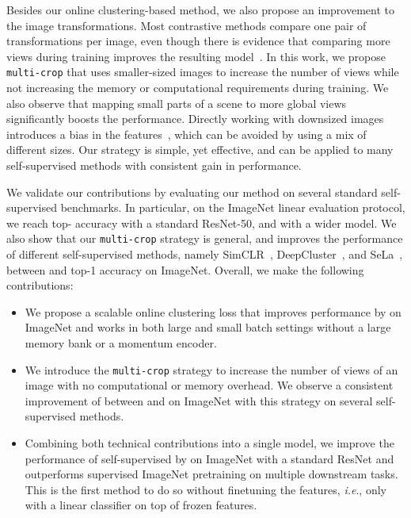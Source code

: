 \documentclass{article}
\def\onedot{.}
\def\ie{\emph{i.e}\onedot} \def\Ie{\emph{I.e}\onedot}
\newcommand{\ImNet}{ImageNet\xspace}
\begin{document}
Besides our online clustering-based method, we also propose an improvement to the image transformations.
Most contrastive methods compare one pair of transformations per image, even though there is evidence that comparing more views during training improves the resulting model~\cite{misra2019self}. 
In this work, we propose \texttt{multi-crop} that uses smaller-sized images to increase the number of views while not increasing the memory or computational requirements during training. 
We also observe that mapping small parts of a scene to more global views significantly boosts the performance.
Directly working with downsized images introduces a bias in the features~\cite{touvron2019fixing}, which can be avoided by using a mix of different sizes. 
Our strategy is simple, yet effective, and can be applied to many self-supervised methods with consistent gain in performance.

We validate our contributions by evaluating our method on several standard self-supervised benchmarks.
In particular, on the ImageNet linear evaluation protocol, we reach  top- accuracy with a standard ResNet-50, and  with a wider model.
We also show that our \texttt{multi-crop} strategy is general, and improves the performance of different self-supervised methods, namely SimCLR~\cite{chen2020simple}, DeepCluster~\cite{caron2018deep}, and SeLa~\cite{asano2019self}, between  and  top-1 accuracy on ImageNet.
Overall, we make the following contributions:
\begin{itemize}[leftmargin=*]
\itemsep0.05em 

\item
We propose a scalable online clustering loss that improves performance by  on ImageNet and works in both large and small batch settings without a large memory bank or a momentum encoder.
\item
We introduce the \texttt{multi-crop} strategy to increase the number of views of an image with no computational or memory overhead.
We observe a consistent improvement of between  and  on \ImNet with this strategy on several self-supervised methods.
\item
Combining both technical contributions into a single model, we improve the performance of self-supervised by  on ImageNet with a standard ResNet and outperforms supervised ImageNet pretraining on multiple downstream tasks.
This is the first method to do so without finetuning the features, \ie, only with a linear classifier on top of frozen features.
\end{itemize}
 
\end{document}
